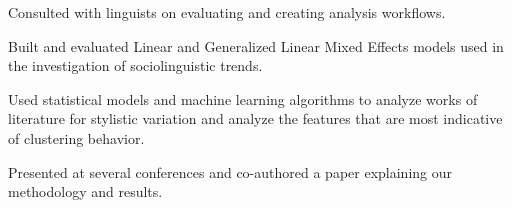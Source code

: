 \documentclass[letterpaper]{deedy-resume} %
\begin{document}
\begin{minipage}[t]{0.63\textwidth}
\begin{tightitemize}
\item Consulted with linguists on evaluating and creating analysis workflows.
\item Built and evaluated Linear and Generalized Linear Mixed Effects
  models used in the investigation of sociolinguistic trends.
\end{tightitemize}

\sectionspace %


\begin{tightitemize}
\item Used statistical models and machine learning algorithms to analyze
  works of literature for stylistic variation and analyze the features
  that are most indicative of clustering behavior.
\item Presented at several conferences and co-authored a paper
  explaining our methodology and results.
\end{tightitemize}
\sectionspace %


\end{minipage} %
\end{document}
